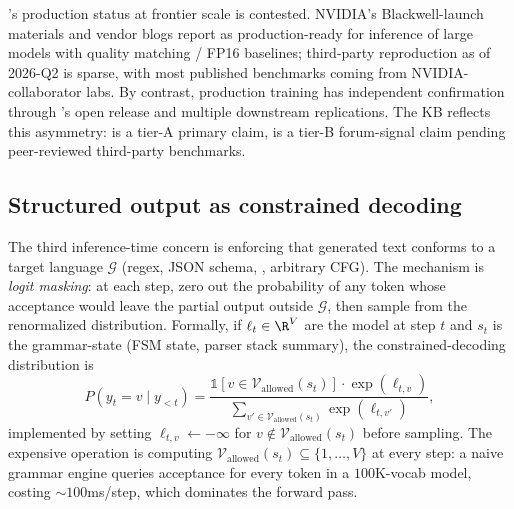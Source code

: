 \begin{contradiction}
's production status at frontier scale is contested. NVIDIA's
Blackwell-launch materials and vendor blogs report  as
production-ready for inference of large models with quality matching
 / FP16 baselines; third-party reproduction as of 2026-Q2 is sparse,
with most published benchmarks coming from NVIDIA-collaborator labs.
By contrast,  production training has independent confirmation
through 's open release \citep[\S 2.5]{deepseek-v3} and
multiple downstream replications. The KB reflects this asymmetry: 
is a tier-A primary claim,  is a tier-B forum-signal claim
pending peer-reviewed third-party benchmarks.
\end{contradiction}

\subsection{Structured output as constrained decoding}
\label{sec:constrained-decoding}

The third inference-time concern is enforcing that generated text
conforms to a target language $\mathcal{G}$ (regex, JSON schema, ,
arbitrary CFG). The mechanism is \emph{logit masking}: at each step,
zero out the probability of any token whose acceptance would leave the
partial output outside $\mathcal{G}$, then sample from the renormalized
distribution. Formally, if $\ell_t \in \R^V$ are the model  at
step $t$ and $s_t$ is the grammar-state (FSM state, parser stack
summary), the constrained-decoding distribution is
\begin{equation}
P(y_t = v \mid y_{<t}) = \frac{\mathbb{1}[v \in \mathcal{V}_{\text{allowed}}(s_t)] \cdot \exp(\ell_{t,v})}{\sum_{v' \in \mathcal{V}_{\text{allowed}}(s_t)} \exp(\ell_{t,v'})},
\label{eq:constrained-decoding}
\end{equation}
implemented by setting $\ell_{t,v} \leftarrow -\infty$ for
$v \notin \mathcal{V}_{\text{allowed}}(s_t)$ before sampling. The
expensive operation is computing
$\mathcal{V}_{\text{allowed}}(s_t) \subseteq \{1, \dots, V\}$ at every
step: a naive grammar engine queries acceptance for every token in a
$100$K-vocab model, costing $\sim 100$ms/step, which dominates the
forward pass.


